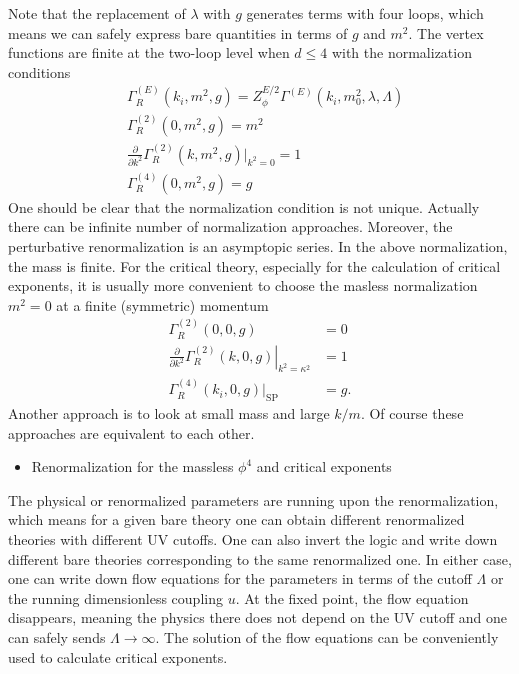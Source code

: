 \documentclass[submission, PhysLectNotes]{SciPost}
\begin{document}
Note that the replacement of $\lambda$ with $g$ generates terms with four loops, which means we can safely express bare quantities in terms of $g$ and $m^2$. The vertex functions are finite at the two-loop level when $d \leq 4$ with the normalization conditions
\begin{equation}
	\begin{aligned}
		&\Gamma_R^{(E)}(k_i,m^2,g) = Z_\phi^{E/2}\Gamma^{(E)}(k_i,m_0^2,\lambda,\Lambda) \\
		&\Gamma_R^{(2)}(0,m^2,g) = m^2 \\
		&\frac{\partial}{\partial k^2}\Gamma_R^{(2)}(k,m^2,g)\vert_{k^2=0} = 1 \\
		&\Gamma_R^{(4)}(0,m^2,g) = g
	\end{aligned}
\end{equation}
One should be clear that the normalization condition is not unique. Actually there can be infinite number of normalization approaches. Moreover, the perturbative renormalization is an asymptopic series. In the above normalization, the mass is finite. For the critical theory, especially for the calculation of critical exponents, it is usually more convenient to choose the masless normalization $m^2 = 0$ at a finite (symmetric) momentum
\begin{equation}
	\begin{aligned}
		\Gamma_R^{(2)}(0,0,g) &= 0 \\
		\left.\frac{\partial}{\partial k^2}\Gamma_R^{(2)}(k,0,g)
		\right\vert_{k^2=\kappa^2} &= 1 \\
		\Gamma_R^{(4)}(k_i,0,g)\vert_{\mathrm{SP}} &= g.
	\end{aligned}
\end{equation}
Another approach is to look at small mass and large $k/m$. Of course these approaches are equivalent to each other. 

\begin{itemize}
	\item Renormalization for the massless $\phi^4$ and critical exponents
\end{itemize}
The physical or renormalized parameters are running upon the renormalization, which means for a given bare theory one can obtain different renormalized theories with different UV cutoffs. One can also invert the logic and write down different bare theories corresponding to the same renormalized one. In either case, one can write down flow equations for the parameters in terms of the cutoff $\Lambda$ or the running dimensionless coupling $u$. At the fixed point, the flow equation disappears, meaning the physics there does not depend on the UV cutoff and one can safely sends $\Lambda \rightarrow \infty$. The solution of the flow equations can be conveniently used to calculate critical exponents. 
\end{document}
